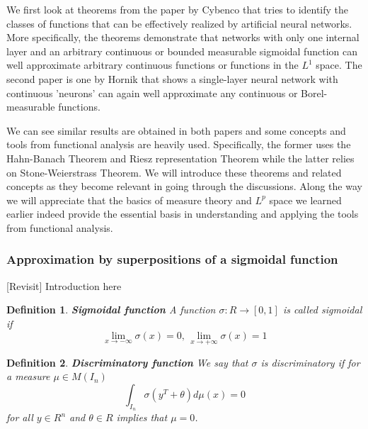 \documentclass[12pt]{amsart}
\newtheorem{definition}{Definition}
\theoremstyle{plain}
\theoremstyle{definition}
\theoremstyle{remark}
\numberwithin{equation}{section}
\numberwithin{thm}{section}
\begin{document}

We first look at theorems from the paper by Cybenco that tries to identify the classes of functions that can be effectively realized by artificial neural networks. More specifically, the theorems demonstrate that networks with only one internal layer and an arbitrary continuous or bounded measurable sigmoidal function can well approximate arbitrary continuous functions or functions in the $L^1$ space. The second paper is one by Hornik that shows a single-layer neural network with continuous 'neurons' can again well approximate any continuous or Borel-measurable functions.  

We can see similar results are obtained in both papers and some concepts and tools from functional analysis are heavily used. Specifically, the former uses the Hahn-Banach Theorem and Riesz representation Theorem while the latter relies on Stone-Weierstrass Theorem. We will introduce these theorems and related concepts as they become relevant in going through the discussions. Along the way we will appreciate that the basics of measure theory and $L^p$ space we learned earlier indeed provide the essential basis in understanding and applying the tools from functional analysis.   



 
\subsubsection{\textbf{Approximation by superpositions of a sigmoidal function}}
[Revisit] Introduction here

\begin{definition} 
\textbf{Sigmoidal function}
A function $\sigma : R \to [0,1]$ is called sigmoidal if
\begin{equation*}
     \lim_{x \to -\infty} \sigma(x)=0 \text{, } \lim_{x \to +\infty} \sigma(x) =1
\end{equation*}
\end{definition}
\begin{definition} 
\textbf{Discriminatory function}
We say that $\sigma$ is discriminatory if for a measure $\mu \in M(I_n)$
\begin{equation*}
    \int_{I_n} \sigma(y^T+\theta)d\mu(x)=0
\end{equation*}
for all $y \in R^n$ and $\theta \in R$ implies that $\mu=0$.
\end{definition}
\end{document}
